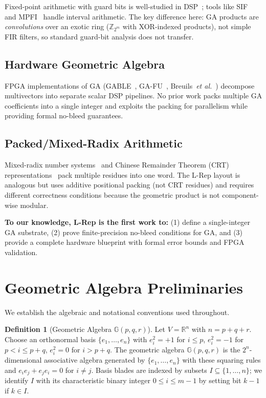 \documentclass[11pt,a4paper]{article}
\theoremstyle{definition}
\newtheorem{definition}{Definition}[section]
\theoremstyle{plain}
\theoremstyle{remark}
\newcommand{\GA}{\mathbb{G}}
\begin{document}
Fixed-point arithmetic with guard bits is well-studied in DSP~\cite{proakis2007,wingham2001}; tools like SIF~\cite{sif} and MPFI~\cite{mpfi} handle interval arithmetic.  The key difference here: GA products are \emph{convolutions} over an exotic ring ($\mathbb{Z}_{2^m}$ with XOR-indexed products), not simple FIR filters, so standard guard-bit analysis does not transfer.

\subsection{Hardware Geometric Algebra}

FPGA implementations of GA (GABLE~\cite{gable}, GA-FU~\cite{gafu}, Breuils~\emph{et al.}~\cite{breuils2017}) decompose multivectors into separate scalar DSP pipelines.  No prior work packs multiple GA coefficients into a single integer and exploits the packing for parallelism while providing formal no-bleed guarantees.

\subsection{Packed/Mixed-Radix Arithmetic}

Mixed-radix number systems~\cite{knuth1998} and Chinese Remainder Theorem (CRT) representations~\cite{crt_fpga} pack multiple residues into one word. The L-Rep layout is analogous but uses additive positional packing (not CRT residues) and requires different correctness conditions because the geometric product is not component-wise modular.

\textbf{To our knowledge, L-Rep is the first work to:} (1) define a single-integer GA substrate, (2) prove finite-precision no-bleed conditions for GA, and (3) provide a complete hardware blueprint with formal error bounds and FPGA validation.

\section{Geometric Algebra Preliminaries}
\label{sec:prelim}

We establish the algebraic and notational conventions used throughout.

\begin{definition}[Geometric Algebra $\GA(p,q,r)$]
Let $V = \mathbb{R}^n$ with $n=p+q+r$.  Choose an orthonormal basis $\{e_1,\ldots,e_n\}$ with $e_i^2=+1$ for $i\le p$, $e_i^2=-1$ for $p<i\le p+q$, $e_i^2=0$ for $i>p+q$.  The geometric algebra $\GA(p,q,r)$ is the $2^n$-dimensional associative algebra generated by $\{e_1,\ldots,e_n\}$ with these squaring rules and $e_ie_j+e_je_i=0$ for $i\neq j$.  Basis blades are indexed by subsets $I\subseteq\{1,\ldots,n\}$; we identify $I$ with its characteristic binary integer $0 \le i \le m-1$ by setting bit $k-1$ if $k\in I$.
\end{definition}
\end{document}
